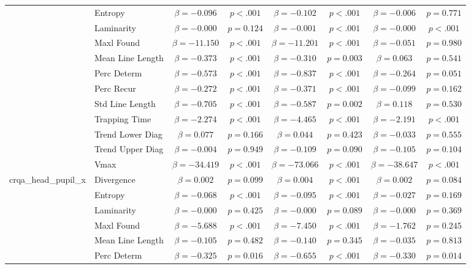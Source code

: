 \begin{tabular}{llcc|cc|cc}
 & Entropy & $\beta = -0.096$ & $p < .001$ & $\beta = -0.102$ & $p < .001$ & $\beta = -0.006$ & $p = 0.771$ \\
 & Laminarity & $\beta = -0.000$ & $p = 0.124$ & $\beta = -0.001$ & $p < .001$ & $\beta = -0.000$ & $p < .001$ \\
 & Maxl Found & $\beta = -11.150$ & $p < .001$ & $\beta = -11.201$ & $p < .001$ & $\beta = -0.051$ & $p = 0.980$ \\
 & Mean Line Length & $\beta = -0.373$ & $p < .001$ & $\beta = -0.310$ & $p = 0.003$ & $\beta = 0.063$ & $p = 0.541$ \\
 & Perc Determ & $\beta = -0.573$ & $p < .001$ & $\beta = -0.837$ & $p < .001$ & $\beta = -0.264$ & $p = 0.051$ \\
 & Perc Recur & $\beta = -0.272$ & $p < .001$ & $\beta = -0.371$ & $p < .001$ & $\beta = -0.099$ & $p = 0.162$ \\
 & Std Line Length & $\beta = -0.705$ & $p < .001$ & $\beta = -0.587$ & $p = 0.002$ & $\beta = 0.118$ & $p = 0.530$ \\
 & Trapping Time & $\beta = -2.274$ & $p < .001$ & $\beta = -4.465$ & $p < .001$ & $\beta = -2.191$ & $p < .001$ \\
 & Trend Lower Diag & $\beta = 0.077$ & $p = 0.166$ & $\beta = 0.044$ & $p = 0.423$ & $\beta = -0.033$ & $p = 0.555$ \\
 & Trend Upper Diag & $\beta = -0.004$ & $p = 0.949$ & $\beta = -0.109$ & $p = 0.090$ & $\beta = -0.105$ & $p = 0.104$ \\
 & Vmax & $\beta = -34.419$ & $p < .001$ & $\beta = -73.066$ & $p < .001$ & $\beta = -38.647$ & $p < .001$ \\
\midrule
\multirow{12}{*}{crqa_head_pupil_x} & Divergence & $\beta = 0.002$ & $p = 0.099$ & $\beta = 0.004$ & $p < .001$ & $\beta = 0.002$ & $p = 0.084$ \\
 & Entropy & $\beta = -0.068$ & $p < .001$ & $\beta = -0.095$ & $p < .001$ & $\beta = -0.027$ & $p = 0.169$ \\
 & Laminarity & $\beta = -0.000$ & $p = 0.425$ & $\beta = -0.000$ & $p = 0.089$ & $\beta = -0.000$ & $p = 0.369$ \\
 & Maxl Found & $\beta = -5.688$ & $p < .001$ & $\beta = -7.450$ & $p < .001$ & $\beta = -1.762$ & $p = 0.245$ \\
 & Mean Line Length & $\beta = -0.105$ & $p = 0.482$ & $\beta = -0.140$ & $p = 0.345$ & $\beta = -0.035$ & $p = 0.813$ \\
 & Perc Determ & $\beta = -0.325$ & $p = 0.016$ & $\beta = -0.655$ & $p < .001$ & $\beta = -0.330$ & $p = 0.014$ \\

\end{tabular}
